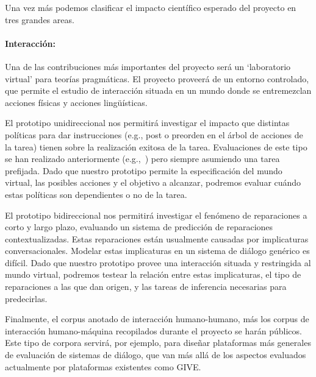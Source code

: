 
Una vez m\'as podemos clasificar el impacto cient\'ifico
esperado del proyecto en tres grandes areas.

\paragraph{Interacci\'on:}
Una de las contribuciones m\'as
importantes del proyecto ser\'a un `laboratorio virtual' para
teor\'ias pragm\'aticas. El proyecto proveer\'a de un
entorno controlado, que permite
el estudio de interacci\'on situada en un mundo donde
se entremezclan acciones f\'isicas y acciones ling\"u\'isticas.

El prototipo unidireccional nos permitir\'a
investigar el impacto que distintas
pol\'iticas para dar instrucciones (e.g., post o
preorden en el \'arbol de acciones de la tarea)
tienen sobre la realizaci\'on exitosa de la tarea.
Evaluaciones de este tipo se han realizado anteriormente
(e.g.,~\citep{foster-etal-ijcai2009}) pero siempre
asumiendo una tarea prefijada.
Dado que nuestro prototipo permite la especificaci\'on
del mundo virtual, las posibles acciones y el objetivo
a alcanzar, podremos evaluar cu\'ando estas pol\'iticas
son dependientes o no de la tarea.

El prototipo bidireccional nos permitir\'a investigar el
fen\'omeno de reparaciones a corto y largo plazo,
evaluando un sistema de predicci\'on de reparaciones
contextualizadas.  Estas reparaciones est\'an usualmente
causadas por implicaturas conversacionales.  Modelar
estas implicaturas en un sistema de di\'alogo gen\'erico
es dif\'icil.  Dado que nuestro prototipo provee una interacci\'on situada
y restringida al mundo virtual, podremos testear la relaci\'on entre
estas implicaturas, el tipo de reparaciones a las que
dan origen, y las tareas de inferencia necesarias para
predecirlas.

Finalmente,
el corpus anotado de interacci\'on humano-humano, m\'as
los corpus de interacci\'on humano-m\'aquina recopilados
durante el proyecto se har\'an p\'ublicos.  Este tipo de
corpora servir\'a, por ejemplo, para dise\~nar plataformas
m\'as generales de evaluaci\'on de sistemas de di\'alogo,
que van m\'as all\'a de los aspectos evaluados actualmente
por plataformas existentes como GIVE.

